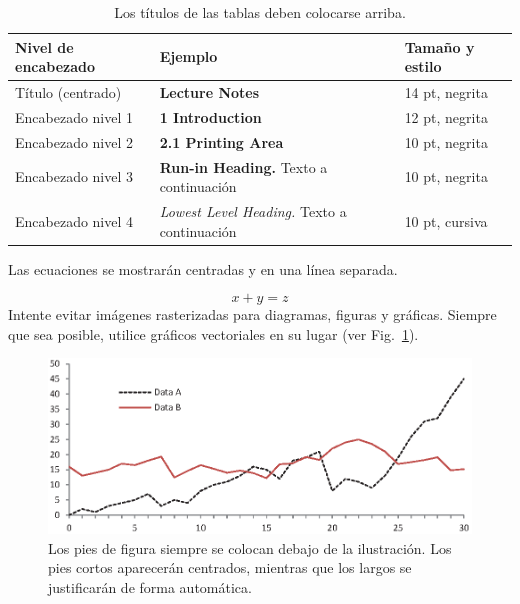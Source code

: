 \documentclass[runningheads]{sistedes}
\begin{document}
\begin{table}
\centering
\caption{Los títulos de las tablas deben colocarse arriba.}\label{tab1}
\begin{tabular}{|l|l|l|}
\hline
Nivel de encabezado & Ejemplo & Tamaño y estilo\\
\hline
Título (centrado) &  {\Large\bfseries Lecture Notes} & 14 pt, negrita\\
Encabezado nivel 1 &  {\large\bfseries 1 Introduction} & 12 pt, negrita\\
Encabezado nivel 2 & {\bfseries 2.1 Printing Area} & 10 pt, negrita\\
Encabezado nivel 3 & {\bfseries Run-in Heading.} Texto a continuación & 10 pt, negrita\\
Encabezado nivel 4 & {\itshape Lowest Level Heading.} Texto a continuación & 10 pt, cursiva\\
\hline
\end{tabular}
\end{table}


Las ecuaciones se mostrarán centradas y en una línea separada.

\begin{equation}
x + y = z
\end{equation}
Intente evitar imágenes rasterizadas para diagramas, figuras y gráficas. 
Siempre que sea posible, utilice gráficos vectoriales en su lugar
(ver Fig.~\ref{fig1}).

\begin{figure}
\includegraphics[width=\textwidth]{fig1.eps}
\caption{Los pies de figura siempre se colocan debajo de la ilustración.
Los pies cortos aparecerán centrados, mientras que los largos se justificarán 
de forma automática.} \label{fig1}
\end{figure}
\end{document}
